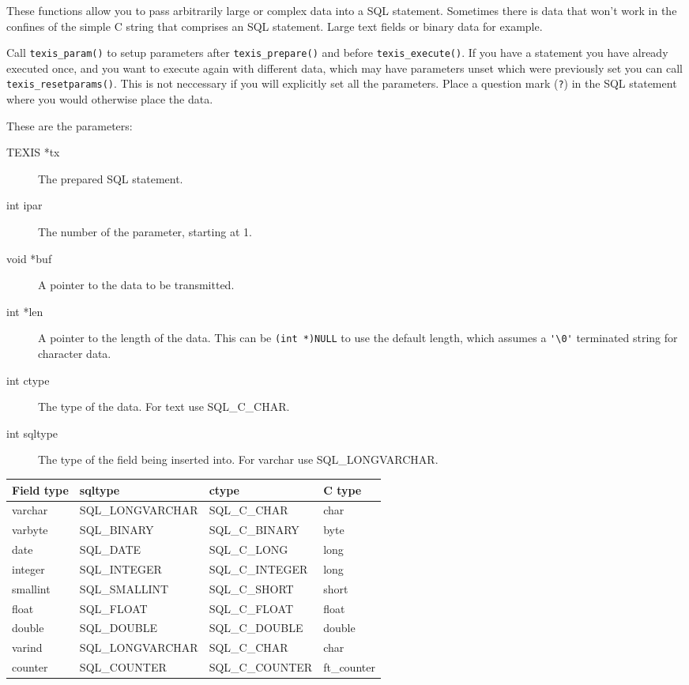 \DESCRIPTION

These functions allow you to pass arbitrarily large or complex data into
a SQL statement. Sometimes there is data that won't work in the confines
of the simple C string that comprises an SQL statement. Large text fields
or binary data for example.

Call \verb`texis_param()` to setup parameters after \verb`texis_prepare()` and
before \verb`texis_execute()`.  If you have a statement you have already
executed once, and you want to execute again with different data, which
may have parameters unset which were previously set you can call
\verb`texis_resetparams()`.  This is not neccessary if you will explicitly
set all the parameters.
Place a question mark (\verb`?`) in the SQL statement where you would
otherwise place the data.

These are the parameters:
\begin{description}
\item[TEXIS     *tx]      The prepared SQL statement.
\item[int     ipar]    The number of the parameter, starting at 1.
\item[void   *buf]     A pointer to the data to be transmitted.
\item[int    *len]     A pointer to the length of the data.  This can be
                       \verb`(int *)NULL` to use the default length, which
                       assumes a \verb`'\0'` terminated string for
                       character data.
\item[int     ctype]   The type of the data.  For text use SQL\_C\_CHAR.
\item[int     sqltype] The type of the field being inserted into.  For
                       varchar use SQL\_LONGVARCHAR.
\end{description}

\begin{tabular}{|l|l|l|l|}\hline
Field type & sqltype          & ctype           & C type     \\ \hline
varchar    & SQL\_LONGVARCHAR & SQL\_C\_CHAR    & char       \\
varbyte    & SQL\_BINARY      & SQL\_C\_BINARY  & byte       \\
date       & SQL\_DATE        & SQL\_C\_LONG    & long       \\
integer    & SQL\_INTEGER     & SQL\_C\_INTEGER & long       \\
smallint   & SQL\_SMALLINT    & SQL\_C\_SHORT   & short      \\
float      & SQL\_FLOAT       & SQL\_C\_FLOAT   & float      \\
double     & SQL\_DOUBLE      & SQL\_C\_DOUBLE  & double     \\
varind     & SQL\_LONGVARCHAR & SQL\_C\_CHAR    & char       \\
counter    & SQL\_COUNTER     & SQL\_C\_COUNTER & ft\_counter \\
\hline
\end{tabular}


